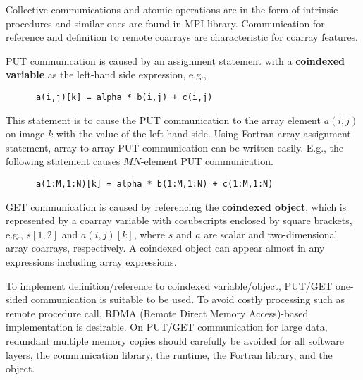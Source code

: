 Collective communications and atomic operations are in the form of 
intrinsic procedures and similar ones are found in MPI library.
Communication for reference and definition to remote coarrays are 
characteristic for coarray features.


PUT communication is caused by an assignment statement with a {\bf coindexed variable} 
as the left-hand side expression, e.g.,
\begin{verbatim}
      a(i,j)[k] = alpha * b(i,j) + c(i,j)
\end{verbatim}
This statement is to cause the PUT communication to the array element $a(i,j)$ on image $k$
with the value of the left-hand side.
%
Using Fortran array assignment statement, array-to-array PUT communication 
can be written easily. E.g., the following statement causes $M N$-element 
PUT communication.
\begin{verbatim}
      a(1:M,1:N)[k] = alpha * b(1:M,1:N) + c(1:M,1:N)
\end{verbatim}



GET communication is caused by referencing the {\bf coindexed object}, 
which is represented by a coarray variable with cosubscripts enclosed by square brackets, 
e.g., $s[1,2]$ and $a(i,j)[k]$, where $s$ and $a$ are scalar and two-dimensional array 
coarrays, respectively.
%
A coindexed object can appear almost in any expressions including array expressions.

\requirement
To implement definition/reference to coindexed variable/object,
PUT/GET one-sided communication is suitable to be used.
%
To avoid costly processing such as remote procedure call, 
RDMA (Remote Direct Memory Access)-based implementation is desirable.
%
On PUT/GET communication for large data, redundant multiple memory copies 
should carefully be avoided for all software layers, 
the communication library, the runtime, the Fortran library, and the object.

